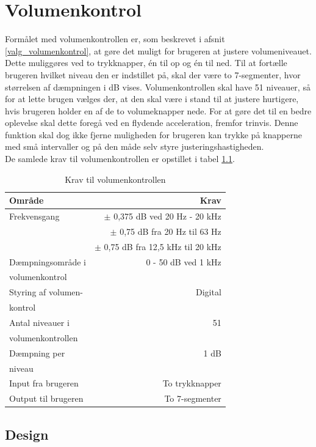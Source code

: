 \chapter{Volumenkontrol}
\label{volumenkontrol}
Formålet med volumenkontrollen er, som beskrevet i afsnit \ref{valg_volumenkontrol}, at gøre det muligt for brugeren at justere volumeniveauet. Dette muliggøres ved to trykknapper, én til op og én til ned. Til at fortælle brugeren hvilket niveau den er indstillet på, skal der være to 7-segmenter, hvor størrelsen af dæmpningen i dB vises. Volumenkontrollen skal have 51 niveauer, så for at lette brugen vælges der, at den skal være i stand til at justere hurtigere, hvis brugeren holder en af de to volumeknapper nede. For at gøre det til en bedre oplevelse skal dette foregå ved en flydende acceleration, fremfor trinvis. Denne funktion skal dog ikke fjerne muligheden for brugeren kan trykke på knapperne med små intervaller og på den måde selv styre justeringshastigheden. \\
De samlede krav til volumenkontrollen er opstillet i tabel \ref{tab:krav_volumenkontrol}.

\begin{table}[h]
\centering
\begin{tabular}{l|r}
\hline\hline
Område & Krav \\
\hline\hline
Frekvensgang & $\pm$ 0,375 dB ved 20 Hz - 20 kHz \\
& $\pm$ 0,75 dB fra 20 Hz til 63 Hz \\
& $\pm$ 0,75 dB fra 12,5 kHz til 20 kHz \\[4pt]
Dæmpningsområde i & 0 - 50 dB ved 1 kHz \\
volumenkontrol & \\[4pt]
Styring af volumen- & Digital \\
kontrol & \\[4pt]
Antal niveauer i & 51 \\
volumenkontrollen & \\[4pt]
Dæmpning per & 1 dB \\
niveau & \\[4pt]
Input fra brugeren & To trykknapper \\[4pt]
Output til brugeren & To 7-segmenter \\
\hline\hline
\end{tabular}
\caption{Krav til volumenkontrollen}
\label{tab:krav_volumenkontrol}
\end{table}

\clearpage
\section{Design}
\label{volumenkontrol-design}

